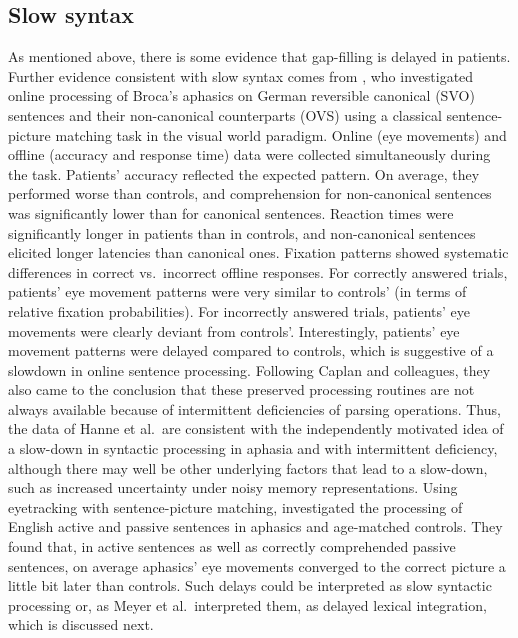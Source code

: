 \documentclass{cambridge7A}\usepackage[]{graphicx}\usepackage[]{color}
\begin{document}
\subsection{Slow syntax}
As mentioned above, there is some evidence that gap-filling is delayed in patients.
Further evidence consistent with slow syntax comes from 
\cite{hanneetal11}, who investigated online processing of Broca's aphasics on German reversible canonical (SVO) sentences and their non-canonical counterparts (OVS) using a classical sentence-picture matching task in the visual world paradigm.
Online (eye movements) and offline (accuracy and response time) data were collected simultaneously during the task. Patients' accuracy reflected the expected pattern. On average, they performed worse than controls, and comprehension for non-canonical sentences was significantly lower than for canonical sentences. Reaction times were significantly longer in patients than in controls, and non-canonical sentences elicited longer latencies than canonical ones. 
Fixation patterns showed systematic differences in correct vs.\ incorrect offline responses. For correctly answered trials, patients' eye movement patterns were very similar to controls' (in terms of relative fixation probabilities). For incorrectly answered trials, patients' eye movements were clearly deviant from controls'. Interestingly, patients' eye movement patterns were delayed compared to controls, which is suggestive of a slowdown in online sentence processing. 
Following Caplan and colleagues, they also came to the conclusion that these preserved processing routines are not always available because of intermittent deficiencies of parsing operations. Thus, the data of Hanne et al.\ are consistent with the independently motivated idea of a slow-down in syntactic processing in aphasia and with intermittent deficiency, although there may well be other underlying factors that lead to a slow-down, such as increased uncertainty under noisy memory representations.
Using eyetracking with sentence-picture matching, \cite{Meyer2012} investigated the processing of English active and passive sentences in aphasics and age-matched controls. They found that, in active sentences as well as correctly comprehended passive sentences, on average aphasics' eye movements converged to the correct picture a little bit later than controls.  Such delays could be interpreted as slow syntactic processing or,  as Meyer et al.~interpreted them, as delayed lexical integration, which is discussed next. 
\end{document}
